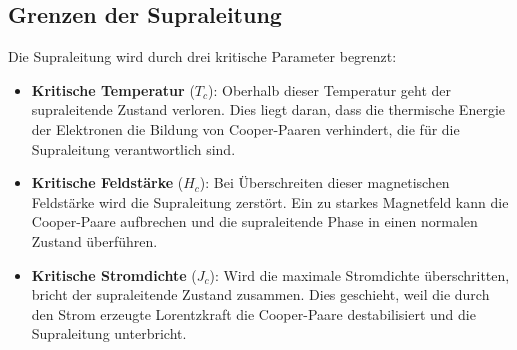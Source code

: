 \subsection{Grenzen der Supraleitung}
Die Supraleitung wird durch drei kritische Parameter begrenzt:

\begin{itemize}
    \item \textbf{Kritische Temperatur} ($T_c$): Oberhalb dieser Temperatur geht der supraleitende Zustand verloren. Dies liegt daran, dass die thermische Energie der Elektronen die Bildung von Cooper-Paaren verhindert, die für die Supraleitung verantwortlich sind.
    \item \textbf{Kritische Feldstärke} ($H_c$): Bei Überschreiten dieser magnetischen Feldstärke wird die Supraleitung zerstört. Ein zu starkes Magnetfeld kann die Cooper-Paare aufbrechen und die supraleitende Phase in einen normalen Zustand überführen.
    \item \textbf{Kritische Stromdichte} ($J_c$): Wird die maximale Stromdichte überschritten, bricht der supraleitende Zustand zusammen. Dies geschieht, weil die durch den Strom erzeugte Lorentzkraft die Cooper-Paare destabilisiert und die Supraleitung unterbricht.
\end{itemize}

